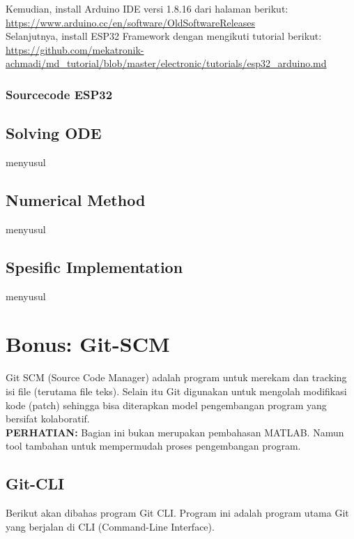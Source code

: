 \documentclass[12pt]{book}
\begin{document}
	Kemudian, install Arduino IDE versi 1.8.16 dari halaman berikut:\\
	\url{https://www.arduino.cc/en/software/OldSoftwareReleases}\\
	
	Selanjutnya, install ESP32 Framework dengan mengikuti tutorial berikut:\\
	\url{https://github.com/mekatronik-achmadi/md_tutorial/blob/master/electronic/tutorials/esp32_arduino.md}
	
	\subsection{Sourcecode ESP32}
	
	\section{Solving ODE}
	
	menyusul
	
	\section{Numerical Method}
	
	menyusul
	
	\section{Spesific Implementation}
	
	menyusul
	
	\chapter{Bonus: Git-SCM}
	
	Git SCM (Source Code Manager) adalah program untuk merekam dan tracking isi file (terutama file teks).
	Selain itu Git digunakan untuk mengolah modifikasi kode (patch) sehingga bisa diterapkan
	model pengembangan program yang bersifat kolaboratif.\\
	
	\textbf{PERHATIAN:} Bagian ini bukan merupakan pembahasan MATLAB.
	Namun tool tambahan untuk mempermudah proses pengembangan program.
	
	\section{Git-CLI}
	
	Berikut akan dibahas program Git CLI.
	Program ini adalah program utama Git yang berjalan di CLI (Command-Line Interface).
	
\end{document}
